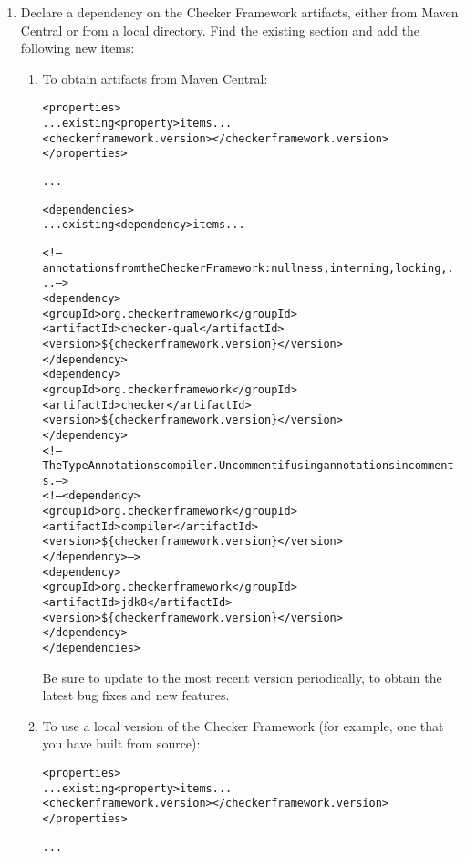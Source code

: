 \begin{enumerate}

\item Declare a dependency on the Checker Framework artifacts, either from
  Maven Central or from a local directory.  Find the
  existing  section and add the following new
   items:

\begin{enumerate}
\item
  To obtain artifacts from Maven Central:

\begin{alltt}
  <properties>
    ... existing <property> items ...
    <checkerframework.version>\ReleaseVersion{}</checkerframework.version>
  </properties>

  ...

  <dependencies>
    ... existing <dependency> items ...

    <!-- annotations from the Checker Framework: nullness, interning, locking, ... -->
    <dependency>
      <groupId>org.checkerframework</groupId>
      <artifactId>checker-qual</artifactId>
      <version>\$\{checkerframework.version\}</version>
    </dependency>
    <dependency>
      <groupId>org.checkerframework</groupId>
      <artifactId>checker</artifactId>
      <version>\$\{checkerframework.version\}</version>
    </dependency>
    <!-- The Type Annotations compiler. Uncomment if using annotations in comments. -->
    <!-- <dependency>
      <groupId>org.checkerframework</groupId>
      <artifactId>compiler</artifactId>
      <version>\$\{checkerframework.version\}</version>
    </dependency> -->
    <dependency>
      <groupId>org.checkerframework</groupId>
      <artifactId>jdk8</artifactId>
      <version>\$\{checkerframework.version\}</version>
    </dependency>
  </dependencies>
\end{alltt}

Be sure to update to the most recent version periodically, to obtain the
latest bug fixes and new features.

\item
  To use a local version of the Checker Framework (for example,
  one that you have built from source):

\begin{alltt}
  <properties>
    ... existing <property> items ...
    <checkerframework.version>\ReleaseVersion{}</checkerframework.version>
  </properties>

  ...


\end{alltt}
\end{enumerate}
\end{enumerate}
